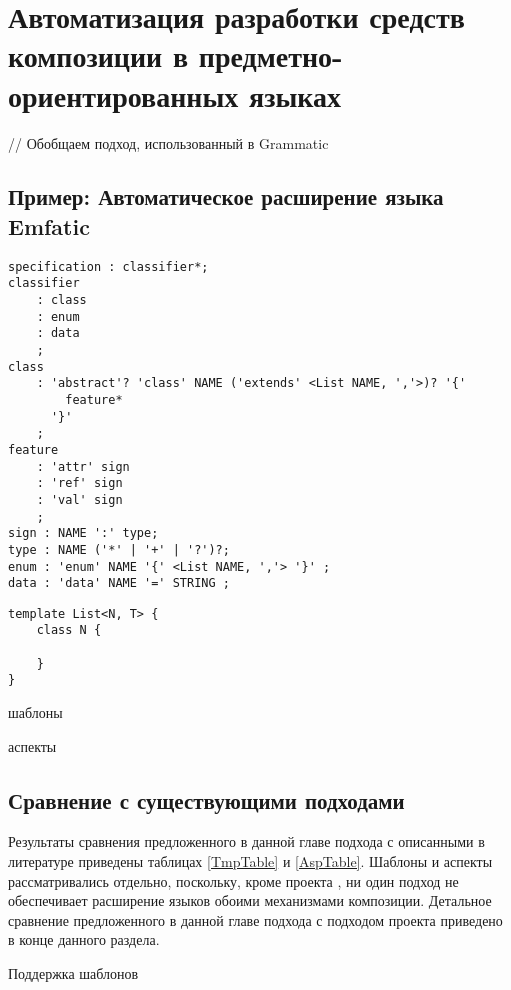 \part{Автоматизация разработки средств композиции в предметно-ориентированных языках}\label{part4}

// Обобщаем подход, использованный в Grammatic





\chapter{Пример: Автоматическое расширение языка Emfatic}

\begin{lstlisting}
specification : classifier*;
classifier
	: class
	: enum
	: data
	;
class
	: 'abstract'? 'class' NAME ('extends' <List NAME, ','>)? '{'
		feature*
	  '}'
	;
feature
	: 'attr' sign
	: 'ref' sign
	: 'val' sign
	;
sign : NAME ':' type;
type : NAME ('*' | '+' | '?')?;
enum : 'enum' NAME '{' <List NAME, ','> '}' ;
data : 'data' NAME '=' STRING ;
\end{lstlisting}

\begin{lstlisting}
template List<N, T> {
	class N {
		
	}
}

\end{lstlisting}

шаблоны

аспекты

\chapter{Сравнение с существующими подходами}

Результаты сравнения предложенного в данной главе подхода с описанными в литературе приведены таблицах \ref{TmpTable} и \ref{AspTable}. Шаблоны и аспекты рассматривались отдельно, поскольку, кроме проекта , ни один подход не обеспечивает расширение языков обоими механизмами композиции. Детальное сравнение предложенного в данной главе подхода с подходом проекта  приведено в конце данного раздела.

\begin{table}[htb]
	\centering
\newcommand{\dissonly}[1]{#1}

	\caption{Поддержка шаблонов}\label{TmpTable}
\end{table}

